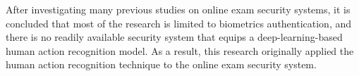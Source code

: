 After investigating many previous studies on online exam security systems, it is concluded that most of the research is limited to biometrics authentication, and there is no readily available security system that equips a deep-learning-based human action recognition model.
As a result, this research originally applied the human action recognition technique to the online exam security system.
